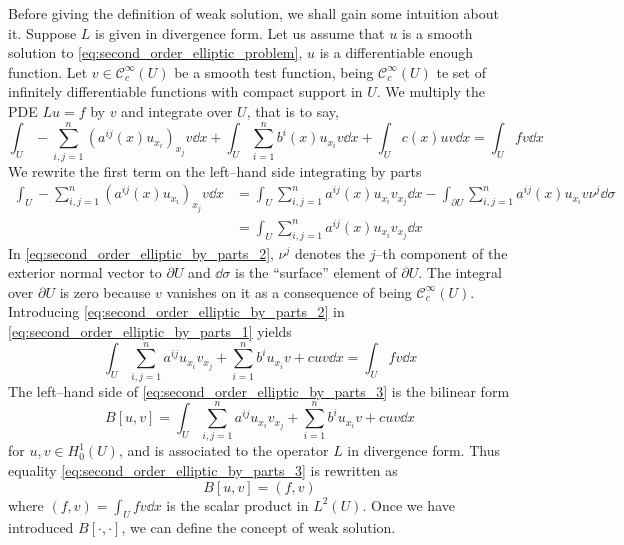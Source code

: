 Before giving the definition of weak solution, we shall gain some intuition
about it. Suppose $L$ is given in divergence form. Let us assume that $u$ is a
smooth solution to \eqref{eq:second_order_elliptic_problem}, \ie $u$ is a
differentiable enough function. Let $v \in \mathcal{C}_c^\infty(U)$ be a smooth
test function, being $\mathcal{C}_c^\infty(U)$ te set of infinitely
differentiable functions with compact support in $U$. We multiply the PDE $L u =
f$ by $v$ and integrate over $U$, that is to say,
\begin{equation} \label{eq:second_order_elliptic_by_parts_1}
	\int_U - \sum_{i,j=1}^n (a^{ij}(x) u_{x_i})_{x_j} v \dd{x} + 
	\int_U \sum_{i=1}^n b^i(x) u_{x_i} v \dd{x} + 
	\int_U c(x) u v \dd{x} = 
	\int_U f v \dd{x}
\end{equation}
We rewrite the first term on the left--hand side integrating by parts
\begin{align}
	\int_U - \sum_{i,j=1}^n (a^{ij}(x) u_{x_i})_{x_j} v \dd{x} &= 
	\int_U \sum_{i,j=1}^n a^{ij}(x) u_{x_i} v_{x_j} \dd{x} - 
	\int_{\partial U} \sum_{i,j=1}^n a^{ij}(x) u_{x_i} v \nu^j \dd{\sigma} \nonumber \\
	&= \int_U \sum_{i,j=1}^n a^{ij}(x) u_{x_i} v_{x_j} \dd{x} \label{eq:second_order_elliptic_by_parts_2}
\end{align}
In \eqref{eq:second_order_elliptic_by_parts_2}, $\nu^j$ denotes the $j$--th
component of the exterior normal vector to $\partial U$ and $\dd{\sigma}$ is the
``surface'' element of $\partial U$. The integral over $\partial U$ is zero
because $v$ vanishes on it as a consequence of being $\mathcal{C}^\infty_c(U)$.
Introducing \eqref{eq:second_order_elliptic_by_parts_2} in
\eqref{eq:second_order_elliptic_by_parts_1} yields
\begin{equation} \label{eq:second_order_elliptic_by_parts_3}
	\int_U \sum_{i,j=1}^n a^{ij} u_{x_i} v_{x_j} + \sum_{i=1}^n b^i u_{x_i} v + c u v \dd{x} =
	\int_U f v \dd{x}
\end{equation}
The left--hand side of \eqref{eq:second_order_elliptic_by_parts_3} is the
bilinear form
\begin{equation}
	B[u,v] = 
	\int_U \sum_{i,j=1}^n a^{ij} u_{x_i} v_{x_j} + \sum_{i=1}^n b^i u_{x_i} v + c u v \dd{x}
\end{equation}
for $u, v \in H^1_0(U)$, and is associated to the operator $L$ in divergence
form. Thus equality \eqref{eq:second_order_elliptic_by_parts_3} is rewritten as
\begin{equation}
	B[u,v] = (f, v)
\end{equation}
where $(f, v) = \int_U f v \dd{x}$ is the scalar product in $L^2(U)$. Once we
have introduced $B[\cdot,\cdot]$, we can define the concept of weak solution.

